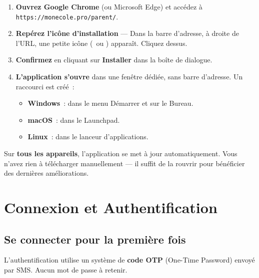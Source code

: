 \documentclass[12pt,a4paper]{report}
\begin{document}
\begin{etape}[title=Proc\'edure : Installation sur ordinateur]
\begin{enumerate}[leftmargin=1.5cm,label=\textbf{\arabic*.},itemsep=12pt]
  \item \textbf{Ouvrez Google Chrome} (ou Microsoft Edge) et acc\'edez \`a \texttt{https://monecole.pro/parent/}.

  \item \textbf{Rep\'erez l'ic\^one d'installation} --- Dans la barre d'adresse, \`a droite de l'URL, une petite ic\^one (\faDesktop\ ou \faPlusCircle) appara\^it. Cliquez dessus.

  \item \textbf{Confirmez} en cliquant sur \textbf{Installer} dans la bo\^ite de dialogue.

  \item \textbf{L'application s'ouvre} dans une fen\^etre d\'edi\'ee, sans barre d'adresse. Un raccourci est cr\'e\'e~:
  \begin{itemize}
    \item \textbf{Windows}~: dans le menu D\'emarrer et sur le Bureau.
    \item \textbf{macOS}~: dans le Launchpad.
    \item \textbf{Linux}~: dans le lanceur d'applications.
  \end{itemize}
\end{enumerate}
\end{etape}

\begin{info}
Sur \textbf{tous les appareils}, l'application se met \`a jour automatiquement. Vous n'avez rien \`a t\'el\'echarger manuellement --- il suffit de la rouvrir pour b\'en\'eficier des derni\`eres am\'eliorations.
\end{info}

\newpage
\chapter{Connexion et Authentification}

\section{Se connecter pour la premi\`ere fois}

L'authentification utilise un syst\`eme de \textbf{code OTP} (One-Time Password) envoy\'e par SMS. Aucun mot de passe \`a retenir.
\end{document}
